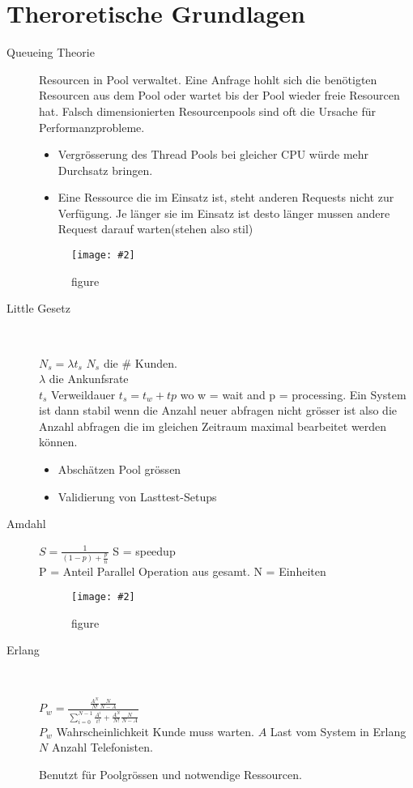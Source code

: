 \documentclass[a4paper,10pt]{scrreprt}
\newcommand{\pic}[2][figure]{\begin{figure}[h]
 \centering
 \texttt{[image: \#2]}
 \caption{#1}
\end{figure}
}
\begin{document}
\section{Theroretische Grundlagen} %
\label{sec:theroretische_grundlagen}
\begin{description}
	\item[Queueing Theorie] Resourcen in Pool verwaltet. Eine Anfrage hohlt sich die benötigten Resourcen aus dem Pool oder wartet bis der Pool wieder freie Resourcen hat. Falsch dimensionierten Resourcenpools sind oft die Ursache für Performanzprobleme.
	\begin{itemize}
		\item Vergrösserung des Thread Pools bei gleicher CPU würde mehr Durchsatz bringen.
		\item Eine Ressource die im Einsatz ist, steht anderen Requests nicht zur Verfügung. Je länger sie im Einsatz ist desto länger mussen andere Request darauf warten(stehen also stil)
	\end{itemize}
	\pic{qtr.png}
	\item[Little Gesetz] \hfill \\
	\begin{framed}
		$N_s = \lambda t_s$
		$N_s$ die \# Kunden.\\
		$\lambda$ die Ankunfsrate\\
		$t_s$ Verweildauer $ t_s = t_{w} + t{p}$ wo w = wait and p = processing.
		Ein System ist dann stabil wenn die Anzahl neuer abfragen nicht grösser ist also die Anzahl abfragen die im gleichen Zeitraum maximal bearbeitet werden können.
	\end{framed}
\begin{itemize}
	\item Abschätzen Pool grössen
	\item Validierung von Lasttest-Setups
\end{itemize}
\item[Amdahl] \hfill
\begin{framed}
	$ S = \frac{1}{(1-p)+\frac{p}{n}}$
	S = speedup \\
	P = Anteil  Parallel Operation aus gesamt.
	N = Einheiten
\end{framed}
\pic{agraph.png}
\item[Erlang] \hfill \\
\begin{framed}
	$P_w = \frac{\frac{A^N}{N!} \frac{N}{N-A}}{\sum^{N-1}_{i=0} \frac{A^i}{i!} + \frac{A^N}{N!} \frac{N}{N-A}}$\\
	$P_w$ Wahrscheinlichkeit Kunde muss warten.
	$A$ Last vom System in Erlang
	$N$ Anzahl Telefonisten.
\end{framed}
Benutzt für Poolgrössen und notwendige Ressourcen.
\end{description}
\end{document}
